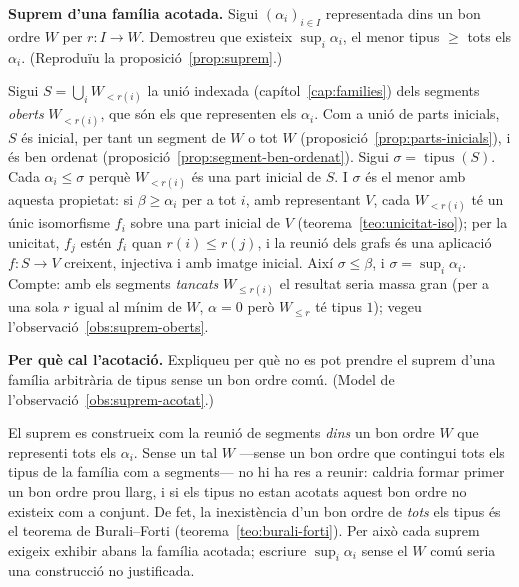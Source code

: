 \begin{exercici}
\textbf{Suprem d'una família acotada.} Sigui \((\alpha_i)_{i\in I}\) representada dins un bon ordre \(W\) per \(r\colon I\to W\). Demostreu que existeix \(\sup_i\alpha_i\), el menor tipus \(\ge\) tots els \(\alpha_i\). (Reproduïu la proposició~\ref{prop:suprem}.)
\end{exercici}
\begin{solucio}
Sigui \(S=\bigcup_{i}W_{<r(i)}\) la unió indexada (capítol~\ref{cap:families}) dels segments \emph{oberts} \(W_{<r(i)}\), que són els que representen els \(\alpha_i\). Com a unió de parts inicials, \(S\) és inicial, per tant un segment de \(W\) o tot \(W\) (proposició~\ref{prop:parts-inicials}), i és ben ordenat (proposició~\ref{prop:segment-ben-ordenat}). Sigui \(\sigma=\operatorname{tipus}(S)\). Cada \(\alpha_i\le\sigma\) perquè \(W_{<r(i)}\) és una part inicial de \(S\). I \(\sigma\) és el menor amb aquesta propietat: si \(\beta\ge\alpha_i\) per a tot \(i\), amb representant \(V\), cada \(W_{<r(i)}\) té un únic isomorfisme \(f_i\) sobre una part inicial de \(V\) (teorema~\ref{teo:unicitat-iso}); per la unicitat, \(f_j\) estén \(f_i\) quan \(r(i)\le r(j)\), i la reunió dels grafs és una aplicació \(f\colon S\to V\) creixent, injectiva i amb imatge inicial. Així \(\sigma\le\beta\), i \(\sigma=\sup_i\alpha_i\). Compte: amb els segments \emph{tancats} \(W_{\le r(i)}\) el resultat seria massa gran (per a una sola \(r\) igual al mínim de \(W\), \(\alpha=0\) però \(W_{\le r}\) té tipus \(1\)); vegeu l'observació~\ref{obs:suprem-oberts}.
\end{solucio}

\begin{exercici}
\textbf{Per què cal l'acotació.} Expliqueu per què no es pot prendre el suprem d'una família arbitrària de tipus sense un bon ordre comú. (Model de l'observació~\ref{obs:suprem-acotat}.)
\end{exercici}
\begin{solucio}
El suprem es construeix com la reunió de segments \emph{dins} un bon ordre \(W\) que representi tots els \(\alpha_i\). Sense un tal \(W\) ---sense un bon ordre que contingui tots els tipus de la família com a segments--- no hi ha res a reunir: caldria formar primer un bon ordre prou llarg, i si els tipus no estan acotats aquest bon ordre no existeix com a conjunt. De fet, la inexistència d'un bon ordre de \emph{tots} els tipus és el teorema de Burali--Forti (teorema~\ref{teo:burali-forti}). Per això cada suprem exigeix exhibir abans la família acotada; escriure \(\sup_i\alpha_i\) sense el \(W\) comú seria una construcció no justificada.
\end{solucio}

